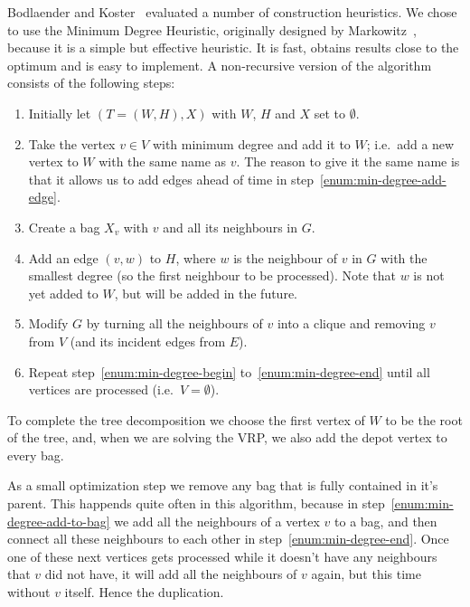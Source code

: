 \documentclass[titlepage, 12pt]{article}
\begin{document}
    Bodlaender and Koster~\cite{tw-upper-bounds} evaluated a number of construction heuristics. We
    chose to use the Minimum Degree Heuristic, originally designed by Markowitz~\cite{min-degree},
    because it is a simple but effective heuristic. It is fast, obtains results close to the optimum
    and is easy to implement.
    A non-recursive version of the algorithm consists of the following steps:
    \begin{enumerate}
        \itemsep 0em
        \item
            Initially let $(T=(W, H), X)$ with $W$, $H$ and $X$ set to $\emptyset$.
        \item
        \label{enum:min-degree-begin}
            Take the vertex $v \in V$ with minimum degree and add it to $W$; i.e.\ add a new
            vertex to $W$ with the same name as $v$.
            The reason to give it the same name is that it allows us to add edges ahead of time in
            step~\ref{enum:min-degree-add-edge}.
        \item
        \label{enum:min-degree-add-to-bag}
            Create a bag $X_v$ with $v$ and all its neighbours in $G$.
        \item
        \label{enum:min-degree-add-edge}
            Add an edge $(v, w)$ to $H$, where $w$ is the neighbour of $v$ in $G$ with the smallest
            degree (so the first neighbour to be processed). Note that $w$ is not yet added to $W$,
            but will be added in the future.
        \item
        \label{enum:min-degree-end}
            Modify $G$ by turning all the neighbours of $v$ into a clique and removing $v$ from
            $V$ (and its incident edges from $E$).
        \item
            Repeat step~\ref{enum:min-degree-begin} to~\ref{enum:min-degree-end} until all vertices
            are processed (i.e.\ $V = \emptyset$).
    \end{enumerate}
    To complete the tree decomposition we choose the first vertex of $W$ to be the root of the tree,
    and, when we are solving the VRP, we also add the depot vertex to every bag.

    As a small optimization step we remove any bag that is fully contained in it's parent. This
    happends quite often in this algorithm, because in step~\ref{enum:min-degree-add-to-bag} we add
    all the neighbours of a vertex $v$ to a bag, and then connect all these neighbours to each other
    in step~\ref{enum:min-degree-end}. Once one of these next vertices gets processed while it
    doesn't have any neighbours that $v$ did not have, it will add all the neighbours of $v$ again,
    but this time without $v$ itself. Hence the duplication.
\end{document}
